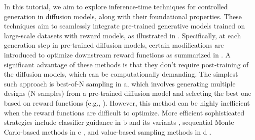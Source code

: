 \documentclass[12pt]{article} %
\begin{document}
{ In this tutorial, we aim to explore inference-time techniques for controlled generation in diffusion models, along with their foundational properties. These techniques aim to seamlessly integrate pre-trained generative models trained on large-scale datasets with reward models, as illustrated in . Specifically, at each generation step in pre-trained diffusion models, certain modifications are introduced to optimize downstream reward functions as summarized in . A significant advantage of these methods is that they don't require post-training of the diffusion models, which can be computationally demanding. The simplest such approach is best-of-N sampling in a, which involves generating multiple designs (N samples) from a pre-trained diffusion model and selecting the best one based on reward functions (e.g., \citet{nakano2021webgpt}). However, this method can be highly inefficient when the reward functions are difficult to optimize. More efficient sophisticated strategies include classifier guidance in b and its variants \citep{dhariwal2021diffusion, song2021score}, sequential Monte Carlo-based methods in c \citep{wu2024practical,dou2024diffusion,cardoso2023monte,phillips2024particle}, and value-based sampling methods in d
 \citep{li2024derivative}.


}
\end{document}
